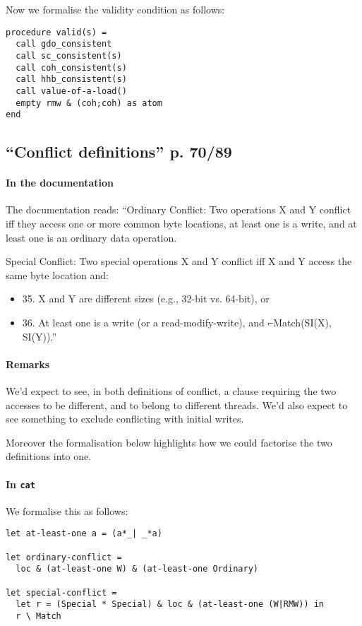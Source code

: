 \documentclass[a4paper]{article}
\begin{document}
Now we formalise the validity condition as follows:
\begin{verbatim}
procedure valid(s) =
  call gdo_consistent
  call sc_consistent(s)
  call coh_consistent(s)
  call hhb_consistent(s)
  call value-of-a-load()
  empty rmw & (coh;coh) as atom
end
\end{verbatim} 

\subsection{``Conflict definitions'' p. 70/89 \label{sec:conflict}}

\paragraph{In the documentation}
The documentation reads: ``Ordinary Conflict: Two operations X and Y conflict
iff they access one or more common byte locations, at least one is a write, and
at least one is an ordinary data operation.

Special Conflict: Two special operations X and Y conflict iff X and Y access
the same byte location and:
\begin{itemize}
\item 35. X and Y are different sizes (e.g., 32-bit vs. 64-bit), or
\item 36. At least one is a write (or a read-modify-write), and ⌐Match(SI(X),
SI(Y)).''
\end{itemize}

\paragraph{Remarks}
We'd expect to see, in both definitions of conflict, a clause requiring the two
accesses to be different, and to belong to different threads. We'd also expect
to see something to exclude conflicting with initial writes.

Moreover the formalisation below highlights how we could factorise the two
definitions into one.

\paragraph{In {\tt cat}}
We formalise this as follows: 
\begin{verbatim}
let at-least-one a = (a*_| _*a)

let ordinary-conflict =
  loc & (at-least-one W) & (at-least-one Ordinary)

let special-conflict =
  let r = (Special * Special) & loc & (at-least-one (W|RMW)) in
  r \ Match
\end{verbatim}
\end{document}
